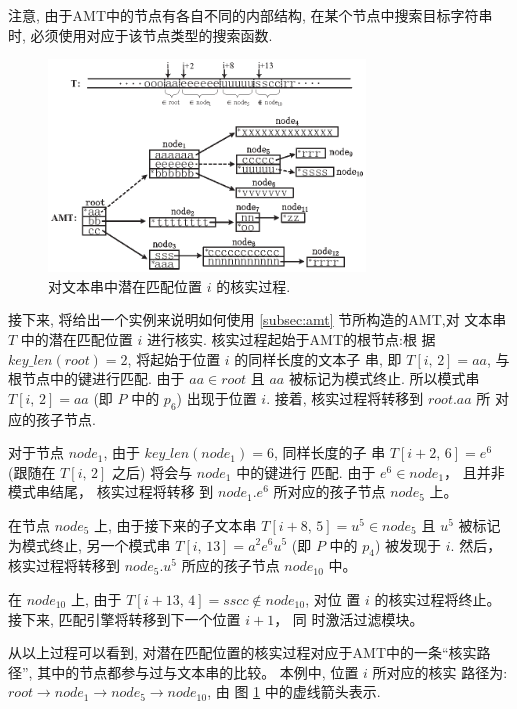 注意, 由于AMT中的节点有各自不同的内部结构, 在某个节点中搜索目标字符串
时, 必须使用对应于该节点类型的搜索函数.

\begin{figure}[!h]
  \centering
  \includegraphics[width=0.75\textwidth]{figures/2_MPM/match}
  \caption{对文本串中潜在匹配位置 $i$ 的核实过程.}
  \label{fig:matching}
\end{figure}

接下来, 将给出一个实例来说明如何使用 \ref{subsec:amt} 节所构造的AMT,对
文本串 $T$ 中的潜在匹配位置 $i$ 进行核实. 核实过程起始于AMT的根节点:根
据 $key\_len(root)=2$, 将起始于位置 $i$ 的同样长度的文本子
串, 即 $T[i,\,2]=aa$, 与根节点中的键进行匹配. 由于 $aa \in
root$ 且 $aa$ 被标记为模式终止. 所以模式串 $T[i,\,2]=aa$
(即 $P$ 中的 $p_6$) 出现于位置 $i$. 接着, 核实过程将转移到 $root.aa$ 所
对应的孩子节点.

对于节点 $node_1$, 由于 $key\_len(node_1)=6$, 同样长度的子
串 $T[i+2,\,6]=e^6$ (跟随在 $T[i,\,2]$ 之后) 将会与 $node_1$ 中的键进行
匹配. 由于 $e^6 \in node_1$， 且并非模式串结尾， 核实过程将转移
到 $node_1.e^6$ 所对应的孩子节点 $node_5$ 上。

在节点 $node_5$ 上, 由于接下来的子文本串 $T[i+8,\,5]=u^5 \in
node_5$ 且 $u^5$ 被标记为模式终止, 另一个模式串 $T[i,\,13]=a^2e^6u^5$
(即 $P$ 中的 $p_4$) 被发现于 $i$. 然后，核实过程将转移到 $node_5.u^5$
所应的孩子节点 $node_{10}$ 中。

在 $node_{10}$ 上, 由于 $T[i+13,\,4]=sscc \notin node_{10}$, 对位
置 $i$ 的核实过程将终止。 接下来, 匹配引擎将转移到下一个位置 $i+1$， 同
时激活过滤模块。

从以上过程可以看到, 对潜在匹配位置的核实过程对应于AMT中的一条“核实路
径”, 其中的节点都参与过与文本串的比较。 本例中, 位置 $i$ 所对应的核实
路径为:
$root \rightarrow node_1 \rightarrow node_5 \rightarrow node_{10}$, 由
图 \ref{fig:matching} 中的虚线箭头表示.


